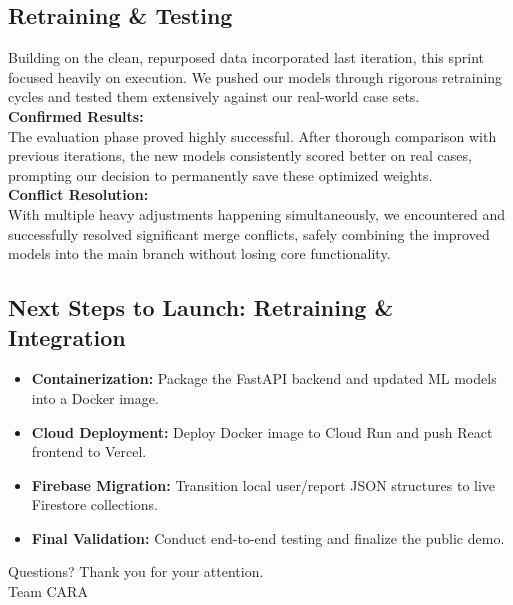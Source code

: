 \documentclass[12pt,a4paper]{article}
\begin{document}
\subsection{Retraining \& Testing}
Building on the clean, repurposed data incorporated last iteration, this sprint focused heavily on execution. We pushed our models through rigorous retraining cycles and tested them extensively against our real-world case sets.\\
\textbf{Confirmed Results:}\\
The evaluation phase proved highly successful. After thorough comparison with previous iterations, the new models consistently scored better on real cases, prompting our decision to permanently save these optimized weights.\\
\textbf{Conflict Resolution:}\\
With multiple heavy adjustments happening simultaneously, we encountered and successfully resolved significant merge conflicts, safely combining the improved models into the main branch without losing core functionality.

\subsection{Next Steps to Launch: Retraining \& Integration}
\begin{itemize}
    \item \textbf{Containerization:} Package the FastAPI backend and updated ML models into a Docker image.
    \item \textbf{Cloud Deployment:} Deploy Docker image to Cloud Run and push React frontend to Vercel.
    \item \textbf{Firebase Migration:} Transition local user/report JSON structures to live Firestore collections.
    \item \textbf{Final Validation:} Conduct end-to-end testing and finalize the public demo.
\end{itemize}

Questions? Thank you for your attention.\\
Team CARA
\end{document}
